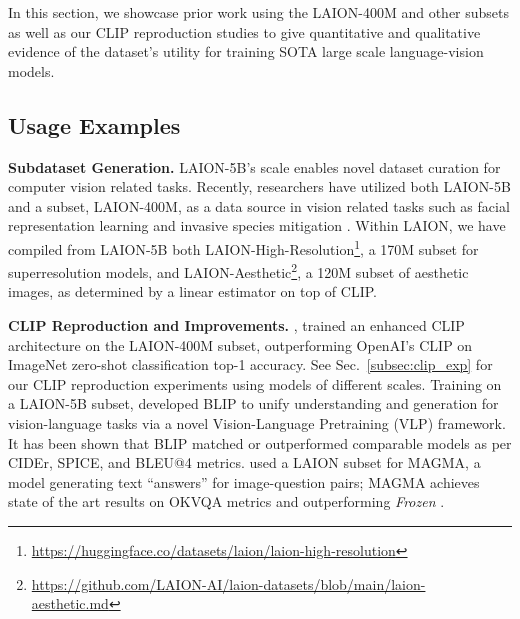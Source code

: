 In this section, we showcase prior work using the LAION-400M \cite{schuhmann2021laion} and other subsets as well as our CLIP reproduction studies to give quantitative and qualitative evidence of the dataset's utility for training SOTA large scale language-vision models.

\subsection{Usage Examples}

\textbf{Subdataset Generation.} LAION-5B's scale enables novel dataset curation for computer vision related tasks. Recently, researchers have utilized both LAION-5B and a subset, LAION-400M, as a data source in vision related tasks such as facial representation learning \cite{LAION-400M-Faces} and invasive species mitigation \cite{lanternrd}. Within LAION, we have compiled from LAION-5B both LAION-High-Resolution\footnote{\href{https://huggingface.co/datasets/laion/laion-high-resolution}{https://huggingface.co/datasets/laion/laion-high-resolution}}, a 170M subset for superresolution models, and LAION-Aesthetic\footnote{\href{https://github.com/LAION-AI/laion-datasets/blob/main/laion-aesthetic.md}{https://github.com/LAION-AI/laion-datasets/blob/main/laion-aesthetic.md}}, a 120M subset of aesthetic images, as determined by a linear estimator on top of CLIP.

\textbf{CLIP Reproduction and Improvements.} \citet{LAION-400M-PyramidCLIP}, trained an enhanced CLIP architecture on the LAION-400M subset, outperforming OpenAI's CLIP on ImageNet zero-shot classification top-1 accuracy. See Sec.~\ref{subsec:clip_exp} for our CLIP reproduction experiments using models of different scales. Training on a LAION-5B subset, \citet{LAION-400M-ImageCaptioning} developed BLIP to unify understanding and generation for vision-language tasks via a novel Vision-Language Pretraining (VLP) framework. It has been shown that BLIP matched or outperformed comparable models as per CIDEr, SPICE, and BLEU@4 metrics. \citet{LAION-400M-MAGMA} used a LAION subset for MAGMA, a model generating text “answers” for image-question pairs; MAGMA achieves state of the art results on OKVQA metrics and outperforming \textit{Frozen} \cite{tsimpoukelli2021multimodal}.

